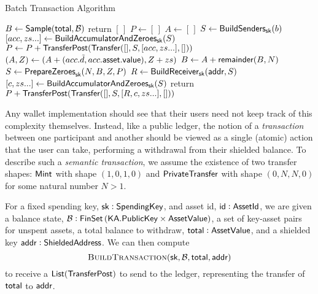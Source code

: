 \begin{algorithm*}
\caption{Batch Transaction Algorithm}
\begin{algorithmic}
        \State $B \gets {\textsf{Sample}}({\textsf{total}}, \mathcal{B})$  
            \State \textsf{return} $[\,]$ 
        \EndIf
        \State $P \gets [\,]$ 
         
            \State $A \gets [\,]$
             
                \State $S \gets {\textsf{BuildSenders}}_{\textsf{sk}}(b)$
                \State $[acc, zs...] \gets {\textsf{BuildAccumulatorAndZeroes}}_{\textsf{sk}}(S)$ 
                \State $P \gets P + {\textsf{TransferPost}}({\textsf{Transfer}}([], S, [acc, zs...], []))$
                \State $(A, Z) \gets (A + (acc.\tilde{d}, acc.{\textsf{asset}}.{\textsf{value}}), Z + zs)$ 
            \EndFor
            \State $B \gets A + {\textsf{remainder}}(B, N)$
        \EndWhile
        \State $S \gets {\textsf{PrepareZeroes}}_{\textsf{sk}}(N, B, Z, P)$ 
        \State $R \gets {\textsf{BuildReceiver}}_{\textsf{sk}}({\textsf{addr}}, S)$
        \State $[c, zs...] \gets {\textsf{BuildAccumulatorAndZeroes}}_{\textsf{sk}}(S)$
        \State \textsf{return} $P + {\textsf{TransferPost}}({\textsf{Transfer}}([], S, [R, c, zs...], []))$
    \EndProcedure
\end{algorithmic}
\end{algorithm*}

Any wallet implementation should see that their users need not keep track of this complexity themselves. Instead, like a public ledger, the notion of a \emph{transaction} between one participant and another should be viewed as a single (atomic) action that the user can take, performing a withdrawal from their shielded balance. To describe such a \emph{semantic transaction}, we assume the existence of two transfer shapes\footnotemark{}: ${\textsf{Mint}}$ with shape $(1, 0, 1, 0)$ and ${\textsf{PrivateTransfer}}$ with shape $(0, N, N, 0)$ for some natural number $N > 1$.


For a fixed spending key, ${\textsf{sk}} : {\textsf{SpendingKey}}$, and asset id, ${\textsf{id}} : {\textsf{AssetId}}$, we are given a balance state, $\mathcal{B} : {\textsf{FinSet}}\left({\textsf{KA}}.{\textsf{PublicKey}} \times {\textsf{AssetValue}}\right)$, a set of key-asset pairs for unspent assets, a total balance to withdraw, ${\textsf{total}} : {\textsf{AssetValue}}$, and a shielded key ${\textsf{addr}} : {\textsf{ShieldedAddress}}$. We can then compute 
\[\textsc{BuildTransaction}({\textsf{sk}}, \mathcal{B}, {\textsf{total}}, {\textsf{addr}})\]
to receive a ${\textsf{List}}({\textsf{TransferPost}})$ to send to the ledger, representing the transfer of ${\textsf{total}}$ to ${\textsf{addr}}$.

